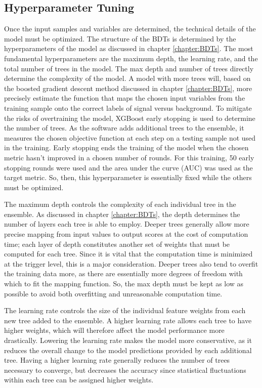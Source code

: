 \documentclass[12pt]{ucsddissertation}
\begin{document}
\subsection{Hyperparameter Tuning}\label{sec:hyperparameters}
Once the input samples and variables are determined, the technical details of the model must be optimized. The structure of the BDTs is determined by the hyperparameters of the model as discussed in chapter \ref{chapter:BDTs}. The most fundamental hyperparameters are the maximum depth, the learning rate, and the total number of trees in the model. The max depth and number of trees directly determine the complexity of the model. A model with more trees will, based on the boosted gradient descent method discussed in chapter \ref{chapter:BDTs}, more precisely estimate the function that maps the chosen input variables from the training sample onto the correct labels of signal versus background. To mitigate the risks of overtraining the model, XGBoost early stopping is used to determine the number of trees. As the software adds additional trees to the ensemble, it measures the chosen objective function at each step on a testing sample not used in the training. Early stopping ends the training of the model when the chosen metric hasn't improved in a chosen number of rounds. For this training, 50 early stopping rounds were used and the area under the curve (AUC) was used as the target metric. So, then, this hyperparameter is essentially fixed while the others must be optimized.

The maximum depth controls the complexity of each individual tree in the ensemble. As discussed in chapter \ref{chapter:BDTs}, the depth determines the number of layers each tree is able to employ. Deeper trees generally allow more precise mapping from input values to output scores at the cost of computation time; each layer of depth constitutes another set of weights that must be computed for each tree. Since it is vital that the computation time is minimized at the trigger level, this is a major consideration. Deeper trees also tend to overfit the training data more, as there are essentially more degrees of freedom with which to fit the mapping function. So, the max depth must be kept as low as possible to avoid both overfitting and unreasonable computation time.

The learning rate controls the size of the individual feature weights from each new tree added to the ensemble. A higher learning rate allows each tree to have higher weights, which will therefore affect the model performance more drastically. Lowering the learning rate makes the model more conservative, as it reduces the overall change to the model predictions provided by each additional tree. Having a higher learning rate generally reduces the number of trees necessary to converge, but decreases the accuracy since statistical fluctuations within each tree can be assigned higher weights. 
\end{document}
